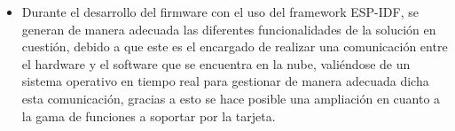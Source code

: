 \begin{itemize}
	\item Durante el desarrollo del firmware con el uso del framework ESP-IDF, se generan de manera adecuada las diferentes funcionalidades de la solución en cuestión, debido a que este es el encargado de realizar una comunicación entre el hardware y el software que se encuentra en la nube, valiéndose de un sistema operativo en tiempo real para gestionar de manera adecuada dicha esta comunicación, gracias a esto se hace posible una ampliación en cuanto a la gama de funciones a soportar por la tarjeta. 
	
\end{itemize}